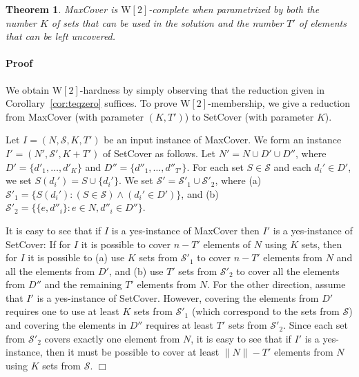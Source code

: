 \documentclass[11pt]{article}
\newtheorem{theorem}{Theorem}
\newenvironment{proof}{\paragraph{Proof}}{\hfill$\Box$\medskip}
\newcommand{\wtwo}{{\mathrm{W[2]}}}
\newcommand{\calS}{{{\mathcal{S}}}}
\begin{document}
\begin{theorem}
  MaxCover is $\wtwo$-complete when parametrized by both the number
  $K$ of sets that can be used in the solution and the number $T'$ of
  elements that can be left uncovered.
\end{theorem}
\begin{proof}
  We obtain $\wtwo$-hardness by simply observing that the reduction
  given in Corollary~\ref{cor:teqzero} suffices. To prove
  $\wtwo$-membership, we give a reduction from MaxCover (with
  parameter $(K,T')$) to SetCover (with parameter $K$).

  Let $I = (N,\calS,K,T')$ be an input instance of MaxCover.  We
  form an instance $I' = (N',\calS',K+T')$ of SetCover as follows.
  Let $N' = N \cup D' \cup D''$, where $D' = \{d'_1, \ldots, d'_K\}$
  and $D'' = \{d''_1, \ldots, d''_{T'}\}$. For each set $S \in \calS$
  and each $d_i' \in D'$, we set $S(d_i') = S \cup \{d_i'\}$.  We set
  $\calS' = \calS'_1 \cup \calS'_2$, where (a) $\calS'_1 = \{ S(d_i'):
  (S \in \calS) \land (d_i' \in D') \}$, and (b) $\calS'_2 = \{ \{e,d''_i\}:
  e \in N, d''_i \in D''\}$.

  It is easy to see that if $I$ is a yes-instance of MaxCover
  then $I'$ is a yes-instance of SetCover: If for $I$ it is possible
  to cover $n-T'$ elements of $N$ using $K$ sets, then for $I$ it is
  possible to (a) use $K$ sets from $\calS'_1$ to cover $n-T'$
  elements from $N$ and all the elements from $D'$, and (b) use $T'$
  sets from $\calS'_2$ to cover all the elements from $D''$ and the
  remaining $T'$ elements from $N$.  For the other direction, assume
  that $I'$ is a yes-instance of SetCover. However, covering the
  elements from $D'$ requires one to use at least $K$ sets from
  $\calS'_1$ (which correspond to the sets from $\calS$) and
  covering the elements in $D''$ requires at least $T'$ sets from
  $\calS'_2$. Since each set from $\calS'_2$ covers exactly one
  element from $N$, it is easy to see that if $I'$ is a yes-instance,
  then it must be possible to cover at least $\|N\|-T'$ elements from
  $N$ using $K$ sets from $\calS$.
\end{proof}
\end{document}

